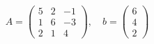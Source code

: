 \documentclass[preview]{standalone}
\begin{document}
\begin{align*}
A = \begin{pmatrix}5 & 2 & -1 \\1 & 6 & -3 \\2 & 1 & 4\end{pmatrix}, \quad b = \begin{pmatrix} 6 \\ 4 \\ 2 \end{pmatrix}
\end{align*}
\end{document}
